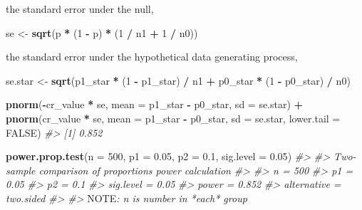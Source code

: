 \documentclass[]{book}
\newenvironment{Shaded}{\begin{snugshade}}{\end{snugshade}}
\newcommand{\AlertTok}[1]{\textcolor[rgb]{0.94,0.16,0.16}{#1}}
\newcommand{\CommentTok}[1]{\textcolor[rgb]{0.56,0.35,0.01}{\textit{#1}}}
\newcommand{\DataTypeTok}[1]{\textcolor[rgb]{0.13,0.29,0.53}{#1}}
\newcommand{\DecValTok}[1]{\textcolor[rgb]{0.00,0.00,0.81}{#1}}
\newcommand{\FloatTok}[1]{\textcolor[rgb]{0.00,0.00,0.81}{#1}}
\newcommand{\KeywordTok}[1]{\textcolor[rgb]{0.13,0.29,0.53}{\textbf{#1}}}
\newcommand{\NormalTok}[1]{#1}
\newcommand{\OperatorTok}[1]{\textcolor[rgb]{0.81,0.36,0.00}{\textbf{#1}}}
\newcommand{\OtherTok}[1]{\textcolor[rgb]{0.56,0.35,0.01}{#1}}
\newcommand{\StringTok}[1]{\textcolor[rgb]{0.31,0.60,0.02}{#1}}
\theoremstyle{definition}
\theoremstyle{definition}
\theoremstyle{definition}
\theoremstyle{remark}
\begin{document}
the standard error under the null,

\begin{Shaded}
\begin{Highlighting}[]
\NormalTok{se <-}\StringTok{ }\KeywordTok{sqrt}\NormalTok{(p }\OperatorTok{*}\StringTok{ }\NormalTok{(}\DecValTok{1} \OperatorTok{-}\StringTok{ }\NormalTok{p) }\OperatorTok{*}\StringTok{ }\NormalTok{(}\DecValTok{1} \OperatorTok{/}\StringTok{ }\NormalTok{n1 }\OperatorTok{+}\StringTok{ }\DecValTok{1} \OperatorTok{/}\StringTok{ }\NormalTok{n0))}
\end{Highlighting}
\end{Shaded}

the standard error under the hypothetical data generating process,

\begin{Shaded}
\begin{Highlighting}[]
\NormalTok{se.star <-}\StringTok{ }\KeywordTok{sqrt}\NormalTok{(p1_star }\OperatorTok{*}\StringTok{ }\NormalTok{(}\DecValTok{1} \OperatorTok{-}\StringTok{ }\NormalTok{p1_star) }\OperatorTok{/}\StringTok{ }\NormalTok{n1 }\OperatorTok{+}\StringTok{ }\NormalTok{p0_star }\OperatorTok{*}\StringTok{ }\NormalTok{(}\DecValTok{1} \OperatorTok{-}\StringTok{ }\NormalTok{p0_star) }\OperatorTok{/}\StringTok{ }\NormalTok{n0)}
\end{Highlighting}
\end{Shaded}

\begin{Shaded}
\begin{Highlighting}[]
\KeywordTok{pnorm}\NormalTok{(}\OperatorTok{-}\NormalTok{cr_value }\OperatorTok{*}\StringTok{ }\NormalTok{se, }\DataTypeTok{mean =}\NormalTok{ p1_star }\OperatorTok{-}\StringTok{ }\NormalTok{p0_star, }\DataTypeTok{sd =}\NormalTok{ se.star) }\OperatorTok{+}
\StringTok{    }\KeywordTok{pnorm}\NormalTok{(cr_value }\OperatorTok{*}\StringTok{ }\NormalTok{se, }\DataTypeTok{mean =}\NormalTok{ p1_star }\OperatorTok{-}\StringTok{ }\NormalTok{p0_star, }\DataTypeTok{sd =}\NormalTok{ se.star,}
          \DataTypeTok{lower.tail =} \OtherTok{FALSE}\NormalTok{)}
\CommentTok{#> [1] 0.852}
\end{Highlighting}
\end{Shaded}

\begin{Shaded}
\begin{Highlighting}[]
\KeywordTok{power.prop.test}\NormalTok{(}\DataTypeTok{n =} \DecValTok{500}\NormalTok{, }\DataTypeTok{p1 =} \FloatTok{0.05}\NormalTok{, }\DataTypeTok{p2 =} \FloatTok{0.1}\NormalTok{, }\DataTypeTok{sig.level =} \FloatTok{0.05}\NormalTok{)}
\CommentTok{#> }
\CommentTok{#>      Two-sample comparison of proportions power calculation }
\CommentTok{#> }
\CommentTok{#>               n = 500}
\CommentTok{#>              p1 = 0.05}
\CommentTok{#>              p2 = 0.1}
\CommentTok{#>       sig.level = 0.05}
\CommentTok{#>           power = 0.852}
\CommentTok{#>     alternative = two.sided}
\CommentTok{#> }
\CommentTok{#> }\AlertTok{NOTE}\CommentTok{: n is number in *each* group}
\end{Highlighting}
\end{Shaded}
\end{document}
